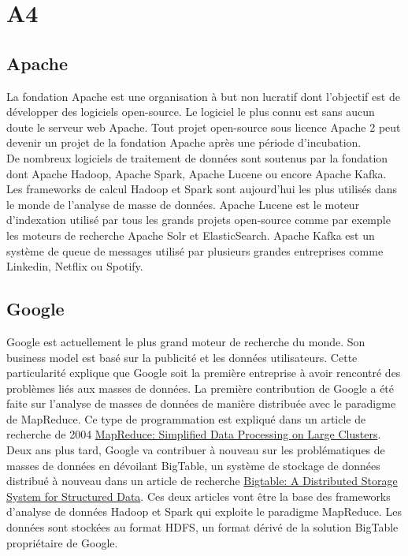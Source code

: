 \section{A4}
  \subsection{Apache}

    La fondation Apache est une organisation à but non lucratif dont l'objectif est de développer des logiciels open-source. Le logiciel le plus connu est sans aucun doute le serveur web Apache. Tout projet open-source sous licence Apache 2 peut devenir un projet de la fondation Apache après une période d'incubation. \\

    De nombreux logiciels de traitement de données sont soutenus par la fondation dont Apache Hadoop, Apache Spark, Apache Lucene ou encore Apache Kafka. Les frameworks de calcul Hadoop et Spark sont aujourd'hui les plus utilisés dans le monde de l'analyse de masse de données. Apache Lucene est le moteur d'indexation utilisé par tous les grands projets open-source comme par exemple les moteurs de recherche Apache Solr et ElasticSearch. Apache Kafka est un système de queue de messages utilisé par plusieurs grandes entreprises comme Linkedin, Netflix ou Spotify.

  \subsection{Google}

    Google est actuellement le plus grand moteur de recherche du monde. Son business model est basé sur la publicité et les données utilisateurs. Cette particularité explique que Google soit la première entreprise à avoir rencontré des problèmes liés aux masses de données. La première contribution de Google a été faite sur l'analyse de masses de données de manière distribuée avec le paradigme de MapReduce. Ce type de programmation est expliqué dans un article de recherche de 2004 \href{https://www.usenix.org/legacy/publications/library/proceedings/osdi04/tech/full_papers/dean/dean_html/index.html}{MapReduce: Simplified Data Processing on Large Clusters}.\\

    Deux ans plus tard, Google va contribuer à nouveau sur les problématiques de masses de données en dévoilant BigTable, un système de stockage de données distribué à nouveau dans un article de recherche \href{http://static.googleusercontent.com/external_content/untrusted_dlcp/research.google.com/en/us/archive/bigtable-osdi06.pdf}{Bigtable: A Distributed Storage System for Structured Data}. Ces deux articles vont être la base des frameworks d'analyse de données Hadoop et Spark qui exploite le paradigme MapReduce. Les données sont stockées au format HDFS, un format dérivé de la solution BigTable propriétaire de Google.

